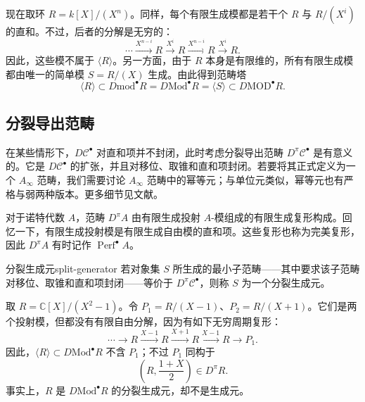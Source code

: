 \begin{example}[截断多项式环的生成元]\label{ex:generator-truncated-polynomial}
现在取环 $R=k[X]/(X^n)$。同样，每个有限生成模都是若干个 $R$ 与 $R/(X^i)$ 的直和。不过，后者的分解是无穷的：
\[
  \cdots\xrightarrow{X^{n-i}}R\xrightarrow{X^i}R
  \xrightarrow{X^{n-i}}R\xrightarrow{X^i}R.
\]
因此，这些模不属于 $\langle R\rangle$。另一方面，由于 $R$ 本身是有限维的，所有有限生成模都由唯一的简单模 $S=R/(X)$ 生成。由此得到范畴塔
\[
  \langle R\rangle\subset D\mathrm{mod}^\bullet R
  =D\mathrm{Mod}^\bullet R=\langle S\rangle
  \subset D\mathrm{MOD}^\bullet R.
\]
\end{example}

\subsection{分裂导出范畴}\label{subsec:split-derived-categories}
在某些情形下，$D\mathcal C^\bullet$ 对直和项并不封闭，此时考虑分裂导出范畴 $D^\pi\mathcal C^\bullet$ 是有意义的。它是 $D\mathcal C^\bullet$ 的扩张，并且对移位、取锥和直和项封闭。若要将其正式定义为一个 $A_\infty$ 范畴，我们需要讨论 $A_\infty$ 范畴中的幂等元；与单位元类似，幂等元也有严格与弱两种版本。更多细节见文献。

\begin{example}[诺特代数的分裂导出范畴]\label{ex:noetherian-split-derived}
对于诺特代数 $A$，范畴 $D^\pi A$ 由有限生成投射 $A$-模组成的有限生成复形构成。回忆一下，有限生成投射模是有限生成自由模的直和项。这些复形也称为完美复形，因此 $D^\pi A$ 有时记作 $\operatorname{Perf}^\bullet A$。
\end{example}

\begin{definition}{分裂生成元}{split-generator}
若对象集 $S$ 所生成的最小子范畴——其中要求该子范畴对移位、取锥和直和项封闭——等价于 $D^\pi\mathcal C^\bullet$，则称 $S$ 为一个分裂生成元。
\end{definition}

\begin{example}[截断环中的分裂生成元]\label{ex:split-generator-truncated}
取 $R=\mathbb C[X]/(X^2-1)$。令 $P_1=R/(X-1)$、$P_2=R/(X+1)$。它们是两个投射模，但都没有有限自由分解，因为有如下无穷周期复形：
\[
  \cdots\longrightarrow R\xrightarrow{X-1}R\xrightarrow{X+1}R
  \xrightarrow{X-1}R\longrightarrow P_1.
\]
因此，$\langle R\rangle\subset D\mathrm{Mod}^\bullet R$ 不含 $P_1$；不过 $P_1$ 同构于
\[
  \left(R,\frac{1+X}{2}\right)\in D^\pi R.
\]
事实上，$R$ 是 $D\mathrm{Mod}^\bullet R$ 的分裂生成元，却不是生成元。
\end{example}

